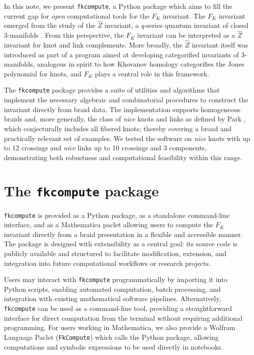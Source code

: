 \documentclass[twocolumn]{article}
\begin{document}
In this note, we present \texttt{fkcompute}, a Python package which aims to fill the current gap for \emph{open} computational tools for the $F_K$ invariant.
The $F_K$ invariant emerged from the study of the $\widehat{Z}$ invariant, a $q$-series quantum invariant of closed 3-manifolds \cite{GPV,GPPV}.
From this perspective, the $F_K$ invariant can be interpreted as a $\widehat{Z}$ invariant for knot and link complements. 
More broadly, the $\widehat{Z}$ invariant itself was introduced as part of a program aimed at developing categorified invariants of 3-manifolds, analogous in spirit to how Khovanov homology categorifies the Jones polynomial for knots, and $F_K$ plays a central role in this framework.

The \texttt{fkcompute} package provides a suite of utilities and algorithms that implement the necessary algebraic and combinatorial procedures to construct the invariant directly from braid data.
The implementation supports homogeneous braids and, more generally, the class of \emph{nice} knots and links as defined by Park \cite{ParkThesis}, which conjecturally includes all fibered knots; thereby covering a broad and practically relevant set of examples. 
We tested the software on \emph{nice} knots with up to 12 crossings and \emph{nice} links up to 10 crossings and 3 components, demonstrating both robustness and computational feasibility within this range.


\section{The \texttt{fkcompute} package}
\texttt{fkcompute} is provided as a Python package, as a standalone command-line interface, and as a Mathematica paclet allowing users to compute the $F_K$ invariant directly from a braid presentation in a flexible and accessible manner.
The package is designed with extensibility as a central goal: its source code is publicly available and structured to facilitate modification, extension, and integration into future computational workflows or research projects.

Users may interact with \texttt{fkcompute} programmatically by importing it into Python scripts, enabling automated computation, batch processing, and integration with existing mathematical software pipelines.
Alternatively, \texttt{fkcompute} can be used as a command-line tool, providing a straightforward interface for direct computation from the terminal without requiring additional programming.
For users working in Mathematica, we also provide a Wolfram Language Paclet (\texttt{FkCompute}) which calls the Python package, allowing computations and symbolic expressions to be used directly in notebooks.
\end{document}
